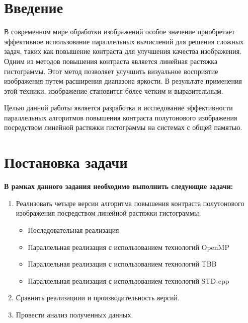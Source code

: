 \documentclass{report}
\begin{document}
\setcounter{page}{2}

\tableofcontents
\newpage

\section*{Введение}
\par В современном мире обработки изображений особое значение приобретает эффективное использование параллельных вычислений для решения сложных задач, таких как повышение контраста для улучшения качества изображения. Одним из методов повышения контраста является линейная растяжка гистограммы. Этот метод позволяет улучшить визуальное восприятие изображения путем расширения диапазона яркости. В результате применения этой техники, изображение становится более четким и выразительным.

\par Целью данной работы является разработка и исследование эффективности параллельных алгоритмов повышения контраста полутонового изображения посредством линейной растяжки гистограммы на системах с общей памятью.

\newpage

\section*{Постановка задачи}
\par \textbf{В рамках данного задания необходимо выполнить следующие задачи:}
\begin{enumerate}
    \item Реализовать четыре версии алгоритма повышения контраста полутонового изображения посредством линейной растяжки гистограммы:
    \begin{itemize}
    \item Последовательная реализация
    \item Параллельная реализация с использованием технологий OpenMP
    \item Параллельная реализация с использованием технологий TBB
    \item Параллельная реализация с использованием технологий STD cpp
    \end{itemize}
    \item Сравнить реализациии и производительность версий.
    \item Провести анализ полученных данных.
\end{enumerate}
\newpage
\end{document}
